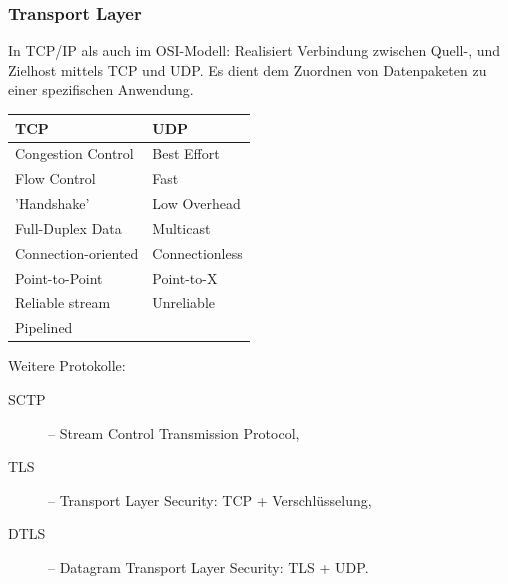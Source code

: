 \documentclass{scrartcl}
\begin{document}
    \subsubsection{Transport Layer}
    \label{OSI:transport_layer}
    In TCP/IP als auch im OSI-Modell: Realisiert Verbindung zwischen Quell-, und Zielhost mittels TCP und UDP. 
    Es dient dem Zuordnen von Datenpaketen zu einer spezifischen Anwendung.
    \begin{center}
        \begin{tabular}{l|l}
        \textbf{TCP} & \textbf{UDP}             \\\hline
        Congestion Control  &   Best Effort     \\
        Flow Control        &   Fast            \\
        'Handshake'         &   Low Overhead    \\
        Full-Duplex Data    &   Multicast       \\
        Connection-oriented &   Connectionless  \\
        Point-to-Point      &   Point-to-X      \\
        Reliable stream     &   Unreliable      \\
        Pipelined           &                   \\
    \end{tabular}
    \end{center}
    Weitere Protokolle:
    \begin{description}
        \item [SCTP] -- Stream Control Transmission Protocol,
        \item [TLS] -- Transport Layer Security: TCP + Verschlüsselung,
        \item [DTLS] -- Datagram Transport Layer Security: TLS + UDP.
    \end{description}
\end{document}
